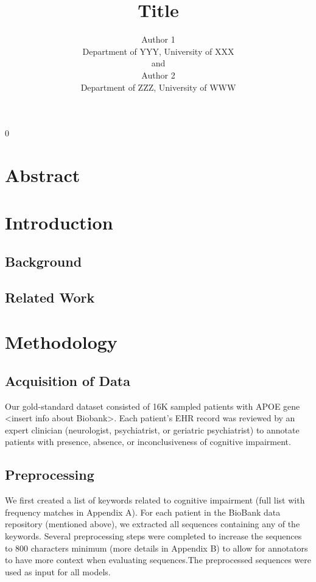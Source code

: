 \documentclass[12pt]{article}
\newcommand{\blind}{0}
\newcommand\tab[1][1cm]{\hspace*{#1}}
\begin{document}
\blind {
    \title {
        \bf Title
    }
    
    \author {
        Author 1 \\
        Department of YYY, University of XXX\\
        and \\
        Author 2 \\
        Department of ZZZ, University of WWW
    }
    
    \maketitle
} \fi

\newpage
    \tableofcontents
\newpage

\section{Abstract}



\section{Introduction}
	\subsection{Background}

	\subsection{Related Work}

\section{Methodology}
	\subsection{Acquisition of Data}
	\tab Our gold-standard dataset consisted of 16K sampled patients with APOE gene <insert info about Biobank>. Each patient's EHR record was reviewed by an expert clinician (neurologist, psychiatrist, or geriatric psychiatrist) to annotate patients with presence, absence, or inconclusiveness of cognitive impairment. 
		
	\subsection{Preprocessing}
	\tab We first created a list of keywords related to cognitive impairment (full list with frequency matches in Appendix A). For each patient in the BioBank data repository (mentioned above), we extracted all sequences containing any of the keywords. Several preprocessing steps were completed to increase the sequences to 800 characters minimum (more details in Appendix B) to allow for annotators to have more context when evaluating sequences.The preprocessed sequences were used as input for all models.
	
\end{document}
